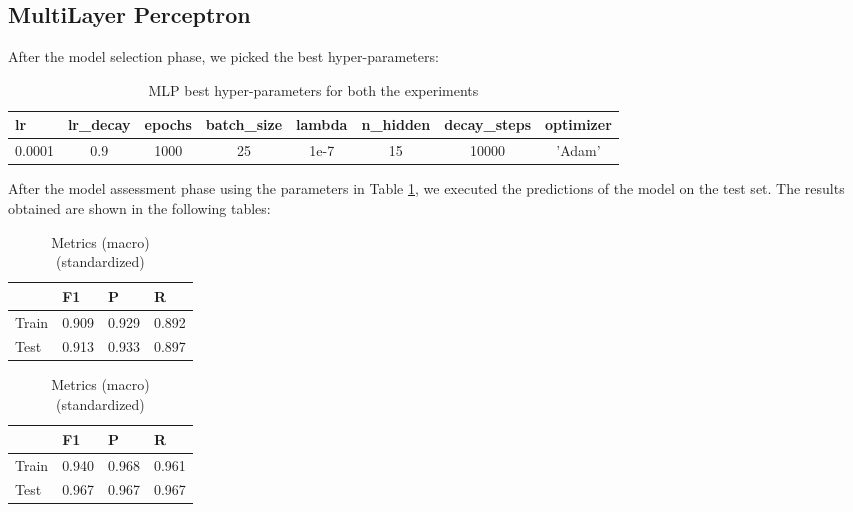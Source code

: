 \documentclass[12pt]{article}
\begin{document}
\newpage
\subsection{MultiLayer Perceptron}
After the model selection phase, we picked the best hyper-parameters:
\begin{table}[H]
\centering
\begin{tabular}{lccccccc}
\toprule
 lr & lr\_decay & epochs & batch\_size & lambda & n\_hidden & decay\_steps & optimizer \\
\midrule
0.0001 & 0.9 & 1000 & 25 & 1e-7 & 15 & 10000 & 'Adam' \\
\bottomrule
\end{tabular}
\caption{MLP best hyper-parameters for both the experiments}
\label{tab:mlp_best_hyper}
\end{table}

After the model assessment phase using the parameters in Table \ref{tab:mlp_best_hyper}, we executed the predictions of the model on the  test set. The results obtained are shown in the following tables:


\begin{table}[ht]
\begin{minipage}[b]{0.5\linewidth}
\centering
    \vfill
    \begin{tabular}{@{}lccc@{}}
    \toprule
     & \multicolumn{1}{l}{F1} & \multicolumn{1}{l}{P} & \multicolumn{1}{l}{R } \\ \midrule
    Train & 0.909 & 0.929 & 0.892 \\
    Test & 0.913 & 0.933 & 0.897 \\ \bottomrule
    \end{tabular}
    \vfill

\caption{Metrics (macro)}
\label{table:mlp_res}
\end{minipage}\hfill
\begin{minipage}[b]{0.5\linewidth}
\centering
    \vfill
    \begin{tabular}{@{}lccc@{}}
    \toprule
     & \multicolumn{1}{l}{F1} & \multicolumn{1}{l}{P} & \multicolumn{1}{l}{R } \\ \midrule
    Train & 0.940 & 0.968 & 0.961 \\
    Test & 0.967 & 0.967 & 0.967 \\ \bottomrule
    \end{tabular}
    \vfill
\caption{Metrics (macro) (standardized)}
\label{table:mlp_res_2}
\end{minipage}\hfill
\end{table}
\end{document}
